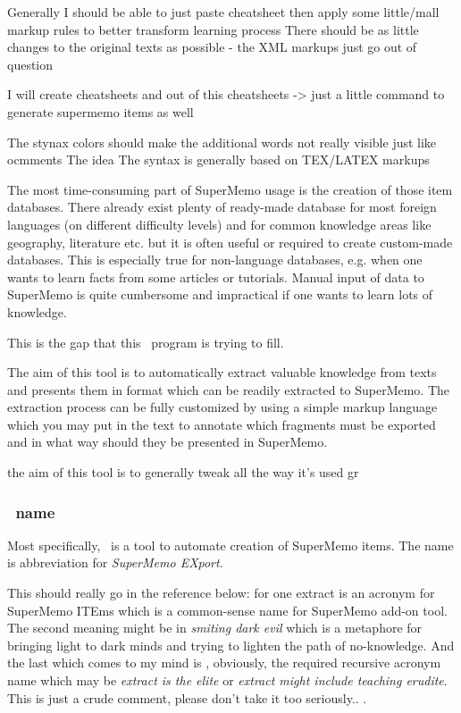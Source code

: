 \documentclass[a4paper,11pt]{article}
\newcommand{\probe}{\emph{\sc{probe{}}}}
\begin{document}
Generally I should be able to just paste cheatsheet then apply some little/mall
markup rules to better transform learning process There should be as little
changes to the original texts as possible - the XML markups just go out of
question

I will create cheatsheets and out of this cheatsheets -> just a little command
to generate supermemo items as well

The stynax colors should make the additional words not really visible just like
ocmments The idea The syntax is generally based on TEX/LATEX markups


The most time-consuming part of SuperMemo usage is the creation of those item
databases. There already exist plenty of ready-made database for most foreign
languages (on different difficulty levels) and for common knowledge areas like
geography, literature etc. but it is often useful or required to create
custom-made databases. This is especially true for non-language databases, e.g.
when one wants to learn facts from some articles or tutorials. Manual input of
data to SuperMemo is quite cumbersome and impractical if one wants to learn
lots of knowledge.

This is the gap that this \probe\ program is trying to fill.

The aim of this tool is to automatically extract valuable knowledge from texts
and presents them in format which can be readily extracted to SuperMemo. The
extraction process can be fully customized by using a simple markup language
which you may put in the text to annotate which fragments must be exported and
in what way should they be presented in SuperMemo.


the aim of this tool is to generally tweak all the way it's used gr

\subsubsection{\probe\ name}

Most specifically, \probe\ is a tool to automate creation of SuperMemo items.
The name is abbreviation for \emph{SuperMemo EXport}.

This should really go in the reference below: for one extract is an acronym for
SuperMemo ITEms which is a common-sense name for SuperMemo add-on tool.  The
second meaning might be in \emph{smiting dark evil} which is a metaphore for
bringing light to dark minds and trying to lighten the path of no-knowledge.
And the last which comes to my mind is , obviously, the required recursive
acronym name which may be \emph{extract is the elite} or \emph{extract might
include teaching erudite}.  This is just a crude comment, please don't take it
too seriously.. .
\end{document}
